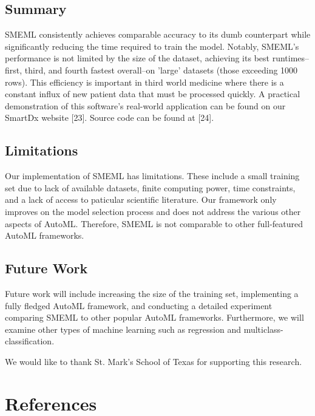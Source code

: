 \documentclass{article}
\begin{document}
\subsection{Summary}
SMEML consistently achieves comparable accuracy to its dumb counterpart while significantly reducing the time required to train the model. Notably, SMEML's performance is not limited by the size of the dataset, achieving its best runtimes--first, third, and fourth fastest overall--on 'large' datasets (those exceeding 1000 rows). This efficiency is important in third world medicine where there is a constant influx of new patient data that must be processed quickly. A practical demonstration of this software's real-world application can be found on our SmartDx website [23]. Source code can be found at [24]. 
\subsection{Limitations}
Our implementation of SMEML has limitations. These include a small training set due to lack of available datasets, finite computing power, time constraints, and a lack of access to paticular scientific literature. Our framework only improves on the model selection process and does not address the various other aspects of AutoML. Therefore, SMEML is not comparable to other full-featured AutoML frameworks.
\subsection{Future Work}
Future work will include increasing the size of the training set, implementing a fully fledged AutoML framework, and conducting a detailed experiment comparing SMEML to other popular AutoML frameworks. Furthermore, we will examine other types of machine learning such as regression and multiclass-classification.

\begin{ack}
We would like to thank St. Mark's School of Texas for supporting this research.
\end{ack}

\section*{References}
\end{document}
